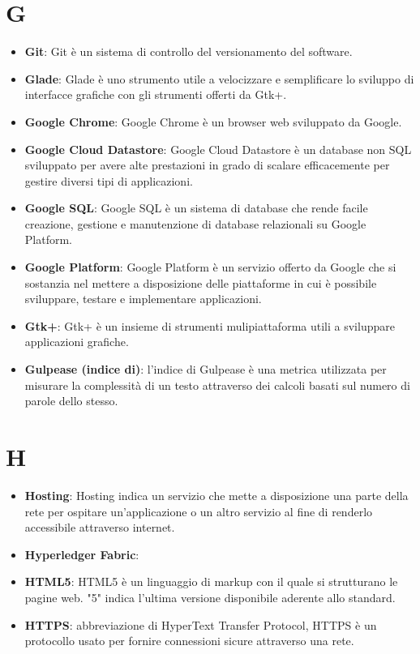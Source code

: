 \documentclass[a4paper, oneside, openany]{article}
\begin{document}
\section{G}
\begin{itemize}
\item \textbf{Git}: Git è un sistema di controllo del versionamento del software.
\item \textbf{Glade}: Glade è uno strumento utile a velocizzare e semplificare lo sviluppo di interfacce grafiche con gli strumenti offerti da Gtk+.
\item \textbf{Google Chrome}: Google Chrome è un browser web sviluppato da Google.
\item \textbf{Google Cloud Datastore}: Google Cloud Datastore è un database non SQL sviluppato per avere alte prestazioni in grado di scalare efficacemente per gestire diversi tipi di applicazioni.
\item \textbf{Google SQL}: Google SQL è un sistema di database che rende facile creazione, gestione e manutenzione di database relazionali su Google Platform.
\item \textbf{Google Platform}: Google Platform è un servizio offerto da Google che si sostanzia nel mettere a disposizione delle piattaforme in cui è possibile sviluppare, testare e implementare applicazioni.
\item \textbf{Gtk+}: Gtk+ è un insieme di strumenti mulipiattaforma utili a sviluppare applicazioni grafiche.
\item \textbf{Gulpease (indice di)}: l'indice di Gulpease è una metrica utilizzata per misurare la complessità di un testo attraverso dei calcoli basati sul numero di parole dello stesso.
\end{itemize}

\section{H}
\begin{itemize}
\item \textbf{Hosting}: Hosting indica un servizio che mette a disposizione una parte della rete per ospitare un'applicazione o un altro servizio al fine di renderlo accessibile attraverso internet.
\item \textbf{Hyperledger Fabric}:	
\item \textbf{HTML5}: HTML5 è un linguaggio di markup con il quale si strutturano le pagine web. "5" indica l'ultima versione disponibile aderente allo standard.
\item \textbf{HTTPS}: abbreviazione di HyperText Transfer Protocol, HTTPS è un protocollo usato per fornire connessioni sicure attraverso una rete.
\end{itemize}
\end{document}
